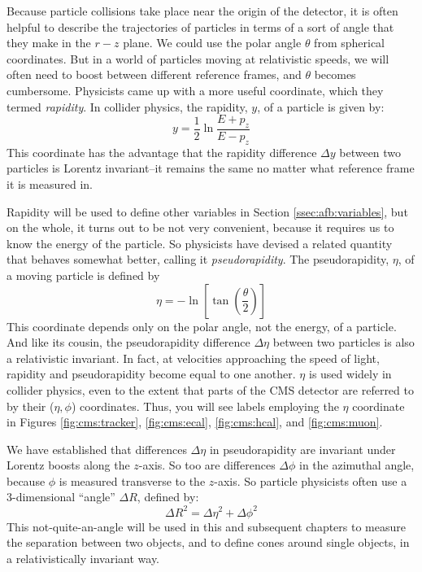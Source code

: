 Because particle collisions take place near the
origin of the detector, it
is often helpful to describe the trajectories of particles in terms of
a sort of angle that they make in the $r-z$ plane. We could use the
polar angle $\theta$ from spherical coordinates. But in a world of
particles moving at relativistic speeds, we will often need to boost
between different reference frames, and $\theta$ becomes
cumbersome. Physicists came up with a more useful coordinate, which
they termed \emph{rapidity}. In collider physics, the rapidity, $y$,
of a particle is given by:
\begin{equation}
\label{eq:cms:rapidity}
y = \frac{1}{2} \ln \frac{E+p_z}{E-p_z}
\end{equation}
This coordinate has the advantage that
the rapidity difference $\Delta y$ between two particles is Lorentz
invariant--it remains the same no matter what reference frame it is
measured in.

Rapidity will be used to define other variables in Section
\ref{ssec:afb:variables}, but on the whole, it turns out to be not
very convenient, because it requires us to know the energy of the
particle. So physicists have devised a related quantity that behaves
somewhat better, calling it \emph{pseudorapidity}. The pseudorapidity,
$\eta$, of a moving particle is defined by
\begin{equation}
\label{eq:cms:eta}
\eta = -\ln \left[ \tan \left( \frac{\theta}{2} \right) \right]
\end{equation}
This coordinate depends only on the polar angle, not the energy, of a
particle. And like its cousin, the pseudorapidity difference $\Delta\eta$
between two particles is also a relativistic invariant. In fact, at
velocities approaching the speed of light, rapidity and pseudorapidity
become equal to one another. $\eta$ is used widely in collider
physics, even to the extent that parts of the CMS detector are
referred to by their ($\eta, \phi$) coordinates. Thus, you will see
labels employing the $\eta$ coordinate in Figures
\ref{fig:cms:tracker}, \ref{fig:cms:ecal}, \ref{fig:cms:hcal}, and
\ref{fig:cms:muon}.

We have established that differences $\Delta \eta$ in pseudorapidity
are invariant under Lorentz boosts along the $z$-axis. So too are
differences $\Delta \phi$ in the azimuthal angle, because $\phi$ is
measured transverse to the $z$-axis. So particle physicists often
use a 3-dimensional ``angle'' $\Delta R$, defined by:
\begin{equation}
\Delta R^2 = \Delta \eta^2 + \Delta \phi^2
\end{equation}
This not-quite-an-angle will be used in this and subsequent chapters
to measure the separation between two objects, and to define cones
around single objects, in a relativistically invariant way.

